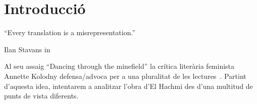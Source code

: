 \section{Introducció}

\epigraph{``Every translation is a misrepresentation.''}{Ilan Stavans in~\autocite{Albin2005}}

Al seu assaig ``Dancing through the minefield'' la crítica literària feminista Annette Kolodny defensa/advoca per a una pluralitat de les lectures~\cite{Kolodny1980}.
Partint d'aquesta idea, intentarem a analitzar l'obra d'El Hachmi des d'una multitud de punts de vista diferents.


\begin{comment}
Fragestellung:
??
verschiedene readings anbieten:
* interseccionalitat
* translation/language
* laurie penny

--> adrienne rich/anette kolodny in die intro nehmen
Annette Kolodny: "In my view, our purpose is not and should not be the formulation of
any single reading method or potentially procrustean set of critical procedures[...] Instead, as I see it, our
task is to initiate nothing less than a playful pluralism, responsice to the possibilities of multiple critical
schools and methods, but captive of none.."
Leitfragen/themen:
* Qui és català? Qui decideix?
* La dona entre dues cultures i dues societats: expectacions, sentiments,... | interseccionalitat
* La dona en una societat machista                                           |
* coming-of-age
* el paper de la llengua

------

Motto candidates:

“The greatest masterpiece in literature is only a dictionary out of order.”
― Jean Cocteau
VA: Jean Cocteau once quipped that even the greatest masterpieces of literature are nothing but a
dictionary out of order.
(Stavans: Dictionaries Interview)

"IS: Every translation is a misrepresentation."
(Stavans: Dictionaries Interview)
\end{comment}
